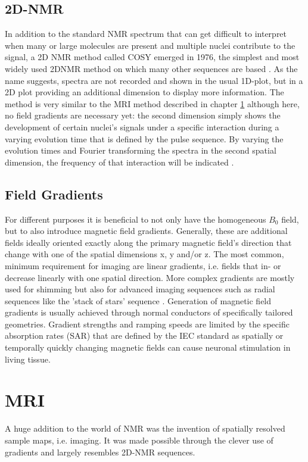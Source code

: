         \subsection{2D-NMR}
        \label{chapter:theory:2DNMR}
        In addition to the standard NMR spectrum that can get difficult to interpret when many or large molecules are present and multiple nuclei contribute to the signal, a 2D NMR method called COSY emerged in 1976, the simplest and most widely used 2DNMR method on which many other sequences are based  \cite{spie_ad_1982-1}. As the name suggests, spectra are not recorded and shown in the usual 1D-plot, but in a 2D plot providing an additional dimension to display more information. The method is very similar to the MRI method described in chapter \ref{sec:theory:MRI} although here, no field gradients are necessary yet: the second dimension simply shows the development of certain nuclei's signals under a specific interaction during a varying evolution time that is defined by the pulse sequence. By varying the evolution times and Fourier transforming the spectra in the second spatial dimension, the frequency of that interaction will be indicated \cite{finster_two-dimensional_1980}.
        \subsection{Field Gradients}
            \label{sec:theory:magneticGradient}
            For different purposes it is beneficial to not only have the homogeneous $B_0$ field, but to also introduce magnetic field gradients. Generally, these are additional fields ideally oriented exactly along the primary magnetic field's direction that change with one of the spatial dimensions x, y and/or z. The most common, minimum requirement for imaging are linear gradients, i.e. fields that in- or decrease linearly with one spatial direction. More complex gradients \cite{littin_development_2018} are mostly used for shimming \cite{kim_regularized_2002} but also for advanced imaging sequences such as radial sequences like the 'stack of stars' sequence \cite{burdumy_one-second_2016}. Generation of magnetic field gradients is usually achieved through normal conductors of specifically tailored geometries. Gradient strengths and ramping speeds are limited by the specific absorption rates (SAR) that are defined by the IEC standard \cite{noauthor_iec_nodate} as spatially or temporally quickly changing magnetic fields can cause neuronal stimulation in living tissue.
    \section{MRI}
    \label{sec:theory:MRI}
        A huge addition to the world of NMR was the invention of spatially resolved sample maps, i.e. imaging. It was made possible through the clever use of gradients and largely resembles 2D-NMR sequences.

